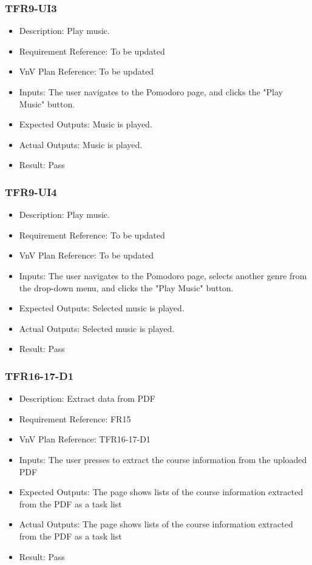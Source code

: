 \documentclass[12pt, titlepage]{article}
\begin{document}
\subsubsection{TFR9-UI3}\label{3.2.12}
\begin{itemize}
    \item Description: Play music.
    \item Requirement Reference: To be updated
    \item VnV Plan Reference: To be updated
    \item Inputs: The user navigates to the Pomodoro page, and clicks the "Play Music" button.
    \item Expected Outputs: Music is played.
    \item Actual Outputs: Music is played.
    \item Result: Pass
\end{itemize}

\subsubsection{TFR9-UI4}\label{3.2.13}
\begin{itemize}
    \item Description: Play music.
    \item Requirement Reference: To be updated
    \item VnV Plan Reference: To be updated
    \item Inputs: The user navigates to the Pomodoro page, selects another genre from the drop-down menu, and clicks the "Play Music" button.
    \item Expected Outputs: Selected music is played.
    \item Actual Outputs: Selected music is played.
    \item Result: Pass
\end{itemize}



\subsubsection{TFR16-17-D1}\label{3.2.14}
\begin{itemize}
    \item Description: Extract data from PDF
    \item Requirement Reference: FR15
    \item VnV Plan Reference: TFR16-17-D1
    \item Inputs: The user presses to extract the course information from the uploaded
PDF
    \item Expected Outputs: The page shows lists of the course information extracted from the PDF
as a task list
    \item Actual Outputs: The page shows lists of the course information extracted from the PDF
as a task list
    \item Result: Pass
\end{itemize}
\end{document}
